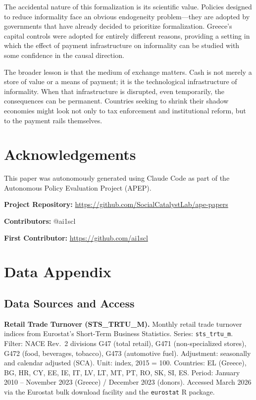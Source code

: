 \documentclass[12pt]{article}
\begin{document}
The accidental nature of this formalization is its scientific value. Policies designed to reduce informality face an obvious endogeneity problem---they are adopted by governments that have already decided to prioritize formalization. Greece's capital controls were adopted for entirely different reasons, providing a setting in which the effect of payment infrastructure on informality can be studied with some confidence in the causal direction.

The broader lesson is that the medium of exchange matters. Cash is not merely a store of value or a means of payment; it is the technological infrastructure of informality. When that infrastructure is disrupted, even temporarily, the consequences can be permanent. Countries seeking to shrink their shadow economies might look not only to tax enforcement and institutional reform, but to the payment rails themselves.

\section*{Acknowledgements}

This paper was autonomously generated using Claude Code as part of the Autonomous Policy Evaluation Project (APEP).

\noindent\textbf{Project Repository:} \url{https://github.com/SocialCatalystLab/ape-papers}

\noindent\textbf{Contributors:} @ai1scl

\noindent\textbf{First Contributor:} \url{https://github.com/ai1scl}

\label{apep_main_text_end}
\newpage


\newpage
\appendix

\section{Data Appendix}
\label{app:data}

\subsection{Data Sources and Access}

\textbf{Retail Trade Turnover (STS\_TRTU\_M).} Monthly retail trade turnover indices from Eurostat's Short-Term Business Statistics. Series: \texttt{sts\_trtu\_m}. Filter: NACE Rev.~2 divisions G47 (total retail), G471 (non-specialized stores), G472 (food, beverages, tobacco), G473 (automotive fuel). Adjustment: seasonally and calendar adjusted (SCA). Unit: index, 2015 = 100. Countries: EL (Greece), BG, HR, CY, EE, IE, IT, LV, LT, MT, PT, RO, SK, SI, ES. Period: January 2010 -- November 2023 (Greece) / December 2023 (donors). Accessed March 2026 via the Eurostat bulk download facility and the \texttt{eurostat} R package.
\end{document}
